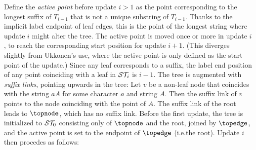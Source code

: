 \documentclass{llncs}
\newcommand\STi[1]{{\mathcal{ST}_{\kern-.222em #1}}}
\begin{document}
 Define the
\emph{active point} before update $i>1$ as the point corresponding to the
longest suffix of $T_{i-1}$ that is not a unique substring of
$T_{i-1}$. Thanks to the implicit label endpoint of leaf edges, this is the point
of the longest string where update $i$ might alter the tree. The active
point is moved once or more in update $i$, to reach the corresponding start
position for update $i+1$. (This diverges
slightly from Ukkonen's use, where the active point is only defined as the
start point of the update.)  Since any leaf corresponds to a
suffix, the label end position of any point coinciding with a leaf in $\STi{i}$
is $i-1$. The tree is augmented with \emph{suffix links},
pointing upwards in the tree: Let $v$ be a non-leaf node that coincides with
the string $aA$ for some character $a$ and string $A$. Then the suffix link of
$v$ points to the node coinciding with the point of $A$. The suffix link of the
root leads to $\topnode$, which has no suffix link. Before the first update,
the tree is initialized to $\STi{0}$ consisting only of $\topnode$ and the
root, joined by $\topedge$, and the active point is set to the endpoint of
$\topedge$ (i.e.\@ the root). Update $i$ then procedes as
follows:
\end{document}

